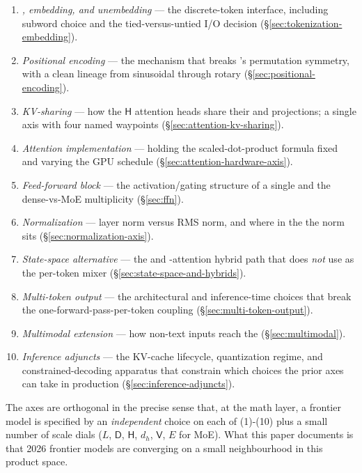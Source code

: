 \begin{enumerate}
  \item \emph{, embedding, and unembedding} --- the
    discrete-token interface, including subword choice and the
    tied-versus-untied I/O decision (\S\ref{sec:tokenization-embedding}).
  \item \emph{Positional encoding} --- the mechanism that breaks
    's permutation symmetry, with a clean lineage from
    sinusoidal through rotary
    (\S\ref{sec:positional-encoding}).
  \item \emph{KV-sharing} --- how the $\mathsf{H}$ attention heads
    share their  and  projections; a single axis with four
    named waypoints (\S\ref{sec:attention-kv-sharing}).
  \item \emph{Attention implementation} --- holding the
    scaled-dot-product formula fixed and varying the GPU schedule
    (\S\ref{sec:attention-hardware-axis}).
  \item \emph{Feed-forward block} --- the activation/gating structure
    of a single  and the dense-vs-MoE multiplicity
    (\S\ref{sec:ffn}).
  \item \emph{Normalization} --- layer norm versus RMS norm, and where
    in the  the norm sits
    (\S\ref{sec:normalization-axis}).
  \item \emph{State-space alternative} --- the  and -attention
    hybrid path that does \emph{not} use 
    as the per-token mixer (\S\ref{sec:state-space-and-hybrids}).
  \item \emph{Multi-token output} --- the architectural and
    inference-time choices that break the
    one-forward-pass-per-token coupling
    (\S\ref{sec:multi-token-output}).
  \item \emph{Multimodal extension} --- how non-text inputs reach the
     (\S\ref{sec:multimodal}).
  \item \emph{Inference adjuncts} --- the KV-cache lifecycle,
    quantization regime, and constrained-decoding apparatus that
    constrain which choices the prior axes can take in production
    (\S\ref{sec:inference-adjuncts}).
\end{enumerate}

The axes are orthogonal in the precise sense that, at the math layer,
a frontier model is specified by an \emph{independent} choice on each
of (1)-(10) plus a small number of scale dials ($L$, $\mathsf{D}$,
$\mathsf{H}$, $d_h$, $\mathsf{V}$, $E$ for MoE). What this paper
documents is that 2026 frontier models are converging on a small
neighbourhood in this product space.

